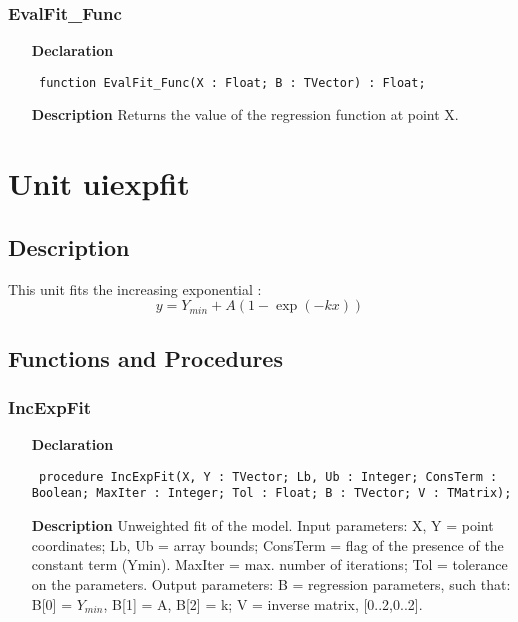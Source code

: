 \documentclass[12pt,a4paper,oneside]{report}
\newcommand{\declarationitem}[1]{\textbf{#1}}
\newcommand{\descriptiontitle}[1]{\textbf{#1}}
\newcommand{\code}[1]{\texttt{#1}}
\begin{document}
\subsubsection{EvalFit{\_}Func}
\label{uevalfit-EvalFit_Func}
\begin{itemize}\item[\declarationitem{Declaration}\hfill]
	\begin{flushleft}
		\code{
			function EvalFit{\_}Func(X : Float; B : TVector) : Float;}
		
	\end{flushleft}
	
	\par
	\item[\descriptiontitle{Description}]
	Returns the value of the regression function at point X.
\end{itemize}

\section{Unit uiexpfit}
\label{uiexpfit}
\subsection{Description}
This unit fits the increasing exponential :
$$y = Y_{min} + A(1-\exp(-kx))$$
\subsection{Functions and Procedures}
\subsubsection{IncExpFit}
\label{uiexpfit-IncExpFit}
\begin{itemize}\item[\declarationitem{Declaration}\hfill]
	\begin{flushleft}
		\code{
			procedure IncExpFit(X, Y : TVector; Lb, Ub : Integer; ConsTerm : Boolean; MaxIter : Integer; Tol : Float; B : TVector; V : TMatrix);}
		
	\end{flushleft}
	
	\par
	\item[\descriptiontitle{Description}]
	Unweighted fit of the model. Input parameters: X, Y = point coordinates; Lb, Ub = array bounds; ConsTerm = flag of the presence of the constant term (Ymin). MaxIter = max. number of iterations; Tol = tolerance on the parameters. Output parameters: B = regression parameters, such that:	
	B[0] = $Y_{min}$, B[1] = A, B[2] = k; V = inverse matrix, [0..2,0..2].
	
\end{itemize}
\end{document}
